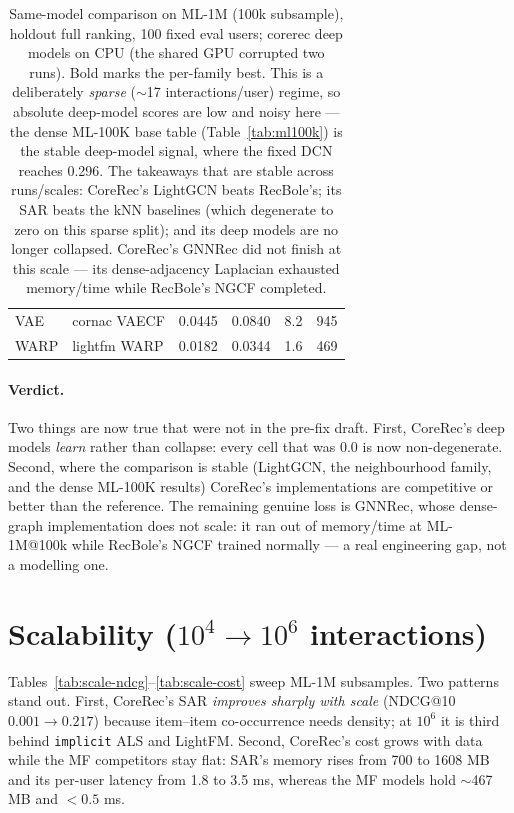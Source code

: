\documentclass[10pt]{article}
\begin{document}
\begin{table}[h]
\begin{tabular}{llrrrr}
VAE  & cornac VAECF       & 0.0445 & 0.0840 & 8.2 & 945 \\
WARP & lightfm WARP       & 0.0182 & 0.0344 & 1.6 & 469 \\
\bottomrule
\end{tabular}
\caption{Same-model comparison on ML-1M (100k subsample), holdout full ranking,
100 fixed eval users; corerec deep models on CPU (the shared GPU corrupted two
runs). Bold marks the per-family best. This is a deliberately \emph{sparse}
($\sim$17 interactions/user) regime, so absolute deep-model scores are low and
noisy here --- the dense ML-100K base table (Table~\ref{tab:ml100k}) is the stable
deep-model signal, where the fixed DCN reaches 0.296. The takeaways that are
stable across runs/scales: CoreRec's LightGCN beats RecBole's; its SAR beats the
kNN baselines (which degenerate to zero on this sparse split); and its deep models
are no longer collapsed. CoreRec's GNNRec did not finish at this scale --- its
dense-adjacency Laplacian exhausted memory/time while RecBole's NGCF completed.}
\label{tab:same}
\end{table}

\paragraph{Verdict.} Two things are now true that were not in the pre-fix draft.
First, CoreRec's deep models \emph{learn} rather than collapse: every cell that was
$0.0$ is now non-degenerate. Second, where the comparison is stable (LightGCN, the
neighbourhood family, and the dense ML-100K results) CoreRec's implementations are
competitive or better than the reference. The remaining genuine loss is GNNRec,
whose dense-graph implementation does not scale: it ran out of memory/time at
ML-1M@100k while RecBole's NGCF trained normally --- a real engineering gap, not a
modelling one.

\section{Scalability ($10^4 \rightarrow 10^6$ interactions)}
Tables~\ref{tab:scale-ndcg}--\ref{tab:scale-cost} sweep ML-1M subsamples. Two
patterns stand out. First, CoreRec's SAR \emph{improves sharply with scale}
(NDCG@10 $0.001\!\rightarrow\!0.217$) because item--item co-occurrence needs
density; at $10^6$ it is third behind \texttt{implicit} ALS and LightFM. Second,
CoreRec's cost grows with data while the MF competitors stay flat: SAR's memory
rises from 700 to 1608 MB and its per-user latency from 1.8 to 3.5 ms, whereas
the MF models hold $\sim$467 MB and $<0.5$ ms.
\end{document}
